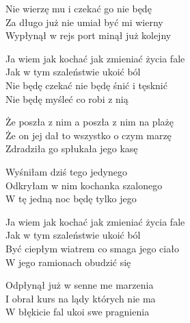 \begin{text}
    Nie wierzę mu i czekać go nie będę\\
    Za długo już nie umiał być mi wierny\\
    Wypłynął w rejs port minął już kolejny

    \vin Ja wiem jak kochać jak zmieniać życia fale\\
    \vin Jak w tym szaleństwie ukoić ból\\
    \vin Nie będę czekać nie będę śnić i tęsknić\\
    \vin Nie będę myśleć co robi z nią

    Że poszła z nim a poszła z nim na plażę\\
    Że on jej dał to wszystko o czym marzę\\
    Zdradziła go spłukała jego kasę

    Wyśniłam dziś tego jedynego\\
    Odkryłam w nim kochanka szalonego\\
    W tę jedną noc będę tylko jego

    \vin Ja wiem jak kochać jak zmieniać życia fale\\
    \vin Jak w tym szaleństwie ukoić ból\\
    \vin Być ciepłym wiatrem co smaga jego ciało\\
    \vin W jego ramionach obudzić się

    Odpłynął już w senne me marzenia\\
    I obrał kurs na lądy których nie ma\\
    W błękicie fal ukoi swe pragnienia
\end{text}

